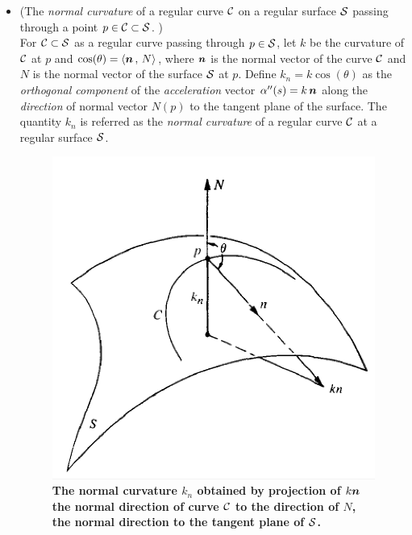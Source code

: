 \documentclass[11pt]{article}
\begin{document}
\begin{itemize}
\item \begin{definition}
(The \emph{normal curvature} of a regular curve ${\mathcal C}$ on a regular surface ${\mathcal S}$ passing through a point $p\in {\mathcal C} \subset {\mathcal S}$. )\\
For ${\mathcal C} \subset {\mathcal S}$ as a regular curve passing through $p\in {\mathcal S}$, let $k$ be the curvature of ${\mathcal C}$ at $p$ and $\cos(\theta) = \left\langle \boldsymbol{n}\,,\, N \right\rangle$, where $\boldsymbol{n}$ is the normal vector of the curve ${\mathcal C}$ and $N$ is the normal vector of the surface ${\mathcal S}$ at $p$. Define $k_{n} = k\cos(\theta)$ as the \emph{orthogonal component} of the \emph{acceleration} vector $\alpha''(s)= k\,\boldsymbol{n}$ along the \emph{direction} of normal vector $N(p)$ to the tangent plane of the surface. The quantity $k_{n}$ is referred as the \emph{normal curvature} of a regular curve ${\mathcal C}$ at a regular surface ${\mathcal S}$. 
\end{definition} 
\begin{figure}[thb]
\centering
\begin{minipage}{0.6\linewidth}
 \centerline{\includegraphics[scale = 0.43]{normal_curv.png}}
\end{minipage}
\caption{\scriptsize
\textbf{The normal curvature $k_{n}$ obtained by projection of $k\boldsymbol{n}$ the normal direction of curve ${\mathcal C}$ to the direction of $N$, the normal direction to the tangent plane of ${\mathcal S}$. }}
\end{figure}


\end{itemize}
\end{document}
